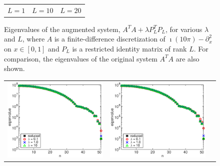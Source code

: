 \documentclass{iopart}
\begin{document}
\begin{figure}
\begin{tabular}{ccc}
{\small $L = 1$}&{\small $L = 10$}&{\small $L = 20$}\\
\end{tabular}
\caption{Eigenvalues of the augmented system,  $A^T\!A + \lambda P_L^T\!P_L$, for various $\lambda$ and $L$, where $A$ is a finite-difference discretization of $\imath(10\pi) - \partial_x^2$ on $x\in [0,1]$
and $P_L$ is a restricted identity matrix of rank $L$. For comparison, the eigenvalues of the original system $A^T\!A$ are also shown.}
\label{fig:example2}
\end{figure}

\begin{figure}
\centering
\begin{tabular}{ccc}
\includegraphics[scale=.2]{./figs/example3_a}&
\includegraphics[scale=.2]{./figs/example3_b}&

\end{tabular}
\end{figure}
\end{document}
